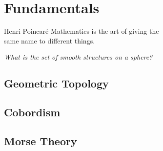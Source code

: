 \chapter{Fundamentals}\label{chap:fundamentals}

\begin{epigraph}{16em}{Henri Poincar\'e}
Mathematics is the art of giving the \\
same name to different things.
\end{epigraph}

\begin{center}
  \textsl{What is the set of smooth structures on a sphere?}
\end{center}

\section{Geometric Topology}\label{sec:differential-topology}

\begin{definition}
\end{definition}

\section{Cobordism}\label{sec:cobordism}

\section{Morse Theory}\label{sec:morse-theory}
